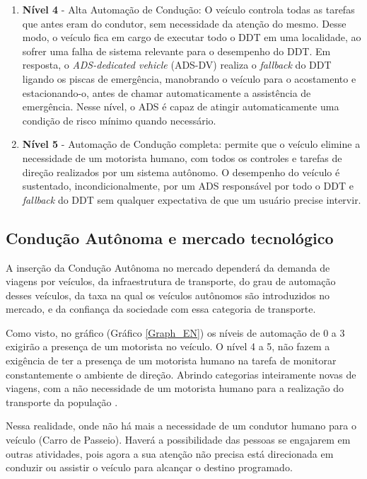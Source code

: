 \begin{enumerate}
\item \textbf{Nível 4} - Alta Automação de Condução: O veículo controla todas as tarefas 
que antes eram do condutor, sem necessidade da atenção do mesmo. Desse modo, o veículo fica em cargo de executar todo o DDT em uma localidade, ao sofrer uma falha de sistema relevante para o desempenho do DDT. Em resposta, o \textit{ADS-dedicated vehicle} (ADS-DV) realiza o \textit{fallback} do DDT ligando os piscas de emergência, manobrando o veículo para o acostamento e estacionando-o, antes de chamar automaticamente a assistência de emergência. Nesse  nível, o ADS é capaz de atingir automaticamente uma condição de risco mínimo quando necessário.

\item \textbf{Nível 5} - Automação de Condução completa: permite que o veículo elimine a necessidade de um motorista humano, com todos os controles e tarefas de direção realizados por um sistema autônomo. O desempenho do veículo é sustentado, incondicionalmente, por um ADS responsável por todo o DDT e \textit{fallback} do DDT sem qualquer expectativa de que um usuário precise intervir.

\end{enumerate}

\subsection{Condução Autônoma e mercado tecnológico}

A inserção da Condução Autônoma no mercado dependerá da demanda de viagens por veículos, da infraestrutura de transporte, do grau de automação desses veículos, da taxa na qual os veículos autônomos são introduzidos no mercado, e da confiança da sociedade com essa categoria de transporte. 

Como visto, no gráfico (Gráfico \ref{Graph_EN}) os níveis de automação de 0 a 3 exigirão a presença de um motorista no veículo. O nível 4 a 5, não fazem a exigência de ter a presença de um motorista humano na tarefa de monitorar constantemente o ambiente de direção. 
Abrindo categorias inteiramente novas de viagens, com a não necessidade de um motorista humano para a realização do transporte da população \cite{notif}.

Nessa realidade, onde não há mais a necessidade de um condutor humano para o veículo (Carro de Passeio). Haverá a possibilidade das pessoas se engajarem em outras atividades, pois agora a sua atenção não precisa está direcionada em conduzir ou assistir o veículo para alcançar o destino programado. 

